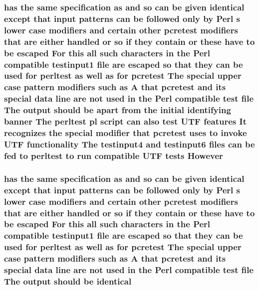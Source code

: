\subsubsection[{\texorpdfstring{However}{However}}]{ has the same specification {\bf as} and {\bf so} {\bf can} {\bf be} {\bf given} {\bf identical} {\bf except} that {\bf input} {\bf patterns} {\bf can} {\bf be} followed only by {\bf Perl} {\bf s} lower {\bf case} {\bf modifiers} and certain other {\bf pcretest} {\bf modifiers} that {\bf are} either handled {\bf or} {\bf so} {\bf if} they contain {\bf or} these have {\bf to} {\bf be} escaped For {\bf this} {\bf all} such {\bf characters} {\bf in} the {\bf Perl} compatible testinput1 {\bf file} {\bf are} escaped {\bf so} that they {\bf can} {\bf be} {\bf used} for perltest {\bf as} well {\bf as} for {\bf pcretest} The {\bf special} {\bf upper} {\bf case} {\bf pattern} {\bf modifiers} such {\bf as} {\bf A} that {\bf pcretest} and its {\bf special} {\bf data} {\bf line} {\bf are} {\bf not} {\bf used} {\bf in} the {\bf Perl} compatible test {\bf file} The {\bf output} should {\bf be} apart {\bf from} the initial identifying banner The perltest {\bf pl} {\bf script} {\bf can} also test U\+TF {\bf features} It {\bf recognizes} the {\bf special} {\bf modifier} that {\bf pcretest} uses {\bf to} invoke U\+TF functionality The testinput4 and testinput6 {\bf files} {\bf can} {\bf be} fed {\bf to} perltest {\bf to} {\bf run} compatible U\+TF {\bf tests} However}\hypertarget{perltest_8txt_a2264b7ac5565a992415e1bcef69f07ee}{}\label{perltest_8txt_a2264b7ac5565a992415e1bcef69f07ee}
\subsubsection[{\texorpdfstring{identical}{identical}}]{ has the same specification {\bf as} and {\bf so} {\bf can} {\bf be} {\bf given} identical {\bf except} that {\bf input} {\bf patterns} {\bf can} {\bf be} followed only by {\bf Perl} {\bf s} lower {\bf case} {\bf modifiers} and certain other {\bf pcretest} {\bf modifiers} that {\bf are} either handled {\bf or} {\bf so} {\bf if} they contain {\bf or} these have {\bf to} {\bf be} escaped For {\bf this} {\bf all} such {\bf characters} {\bf in} the {\bf Perl} compatible testinput1 {\bf file} {\bf are} escaped {\bf so} that they {\bf can} {\bf be} {\bf used} for perltest {\bf as} well {\bf as} for {\bf pcretest} The {\bf special} {\bf upper} {\bf case} {\bf pattern} {\bf modifiers} such {\bf as} {\bf A} that {\bf pcretest} and its {\bf special} {\bf data} {\bf line} {\bf are} {\bf not} {\bf used} {\bf in} the {\bf Perl} compatible test {\bf file} The {\bf output} should {\bf be} identical}\hypertarget{perltest_8txt_a679f8e28e8e7ea47aa69fdb4a13bd8ad}{}\label{perltest_8txt_a679f8e28e8e7ea47aa69fdb4a13bd8ad}
